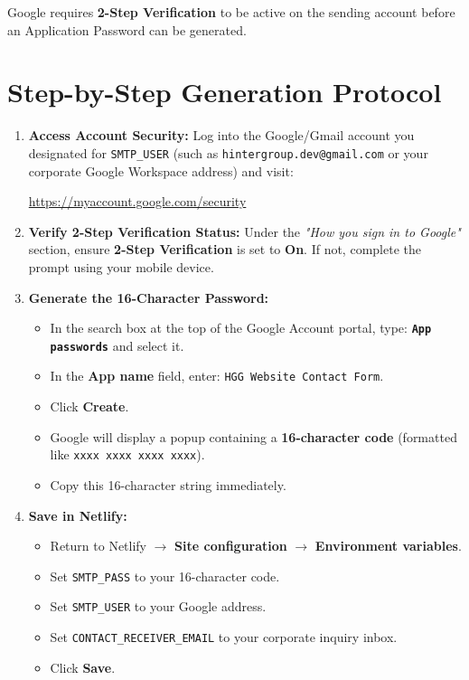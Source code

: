 \documentclass[11pt,a4paper,oneside]{book}
\begin{document}
\begin{goldbox}[Prerequisite]
Google requires \textbf{2-Step Verification} to be active on the sending account before an Application Password can be generated.
\end{goldbox}

\section{Step-by-Step Generation Protocol}

\begin{enumerate}[leftmargin=*,label=\textbf{Step \arabic*:}]
  \item \textbf{Access Account Security:}
    Log into the Google/Gmail account you designated for \texttt{SMTP\_USER} (such as \texttt{hintergroup.dev@gmail.com} or your corporate Google Workspace address) and visit:
    \begin{center}
      \url{https://myaccount.google.com/security}
    \end{center}

  \item \textbf{Verify 2-Step Verification Status:}
    Under the \textit{"How you sign in to Google"} section, ensure \textbf{2-Step Verification} is set to \textbf{On}. If not, complete the prompt using your mobile device.

  \item \textbf{Generate the 16-Character Password:}
    \begin{itemize}[leftmargin=1.5cm]
      \item In the search box at the top of the Google Account portal, type: \textbf{\texttt{App passwords}} and select it.
      \item In the \textbf{App name} field, enter: \texttt{HGG Website Contact Form}.
      \item Click \textbf{Create}.
      \item Google will display a popup containing a \textbf{16-character code} (formatted like \texttt{xxxx xxxx xxxx xxxx}).
      \item Copy this 16-character string immediately.
    \end{itemize}

  \item \textbf{Save in Netlify:}
    \begin{itemize}[leftmargin=1.5cm]
      \item Return to Netlify $\rightarrow$ \textbf{Site configuration} $\rightarrow$ \textbf{Environment variables}.
      \item Set \texttt{SMTP\_PASS} to your 16-character code.
      \item Set \texttt{SMTP\_USER} to your Google address.
      \item Set \texttt{CONTACT\_RECEIVER\_EMAIL} to your corporate inquiry inbox.
      \item Click \textbf{Save}.
    \end{itemize}
\end{enumerate}
\end{document}
